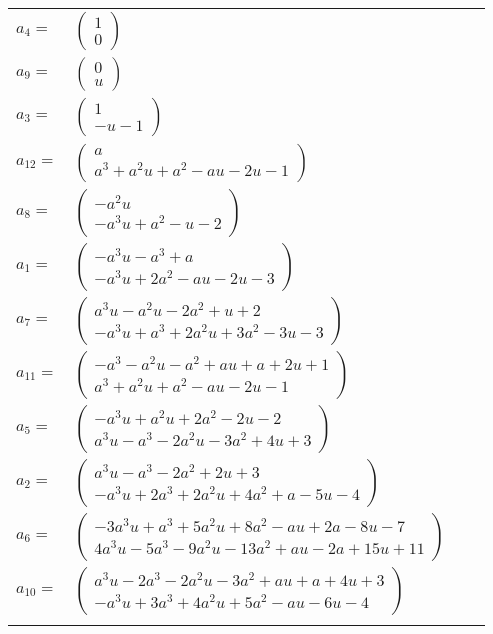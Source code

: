 \documentclass[1p]{elsarticle_modified}
\theoremstyle{definition}
\begin{document}
\begin{tabular}{m{7pt} m{180pt} m{7pt} m{180pt} }
\flushright $a_{4}=$&$\begin{pmatrix}1\\0\end{pmatrix}$ \\
\flushright $a_{9}=$&$\begin{pmatrix}0\\u\end{pmatrix}$ \\
\flushright $a_{3}=$&$\begin{pmatrix}1\\- u-1\end{pmatrix}$ \\
\flushright $a_{12}=$&$\begin{pmatrix}a\\a^3+a^2 u+a^2- a u-2 u-1\end{pmatrix}$ \\
\flushright $a_{8}=$&$\begin{pmatrix}- a^2 u\\- a^3 u+a^2- u-2\end{pmatrix}$ \\
\flushright $a_{1}=$&$\begin{pmatrix}- a^3 u- a^3+a\\- a^3 u+2 a^2- a u-2 u-3\end{pmatrix}$ \\
\flushright $a_{7}=$&$\begin{pmatrix}a^3 u- a^2 u-2 a^2+u+2\\- a^3 u+a^3+2 a^2 u+3 a^2-3 u-3\end{pmatrix}$ \\
\flushright $a_{11}=$&$\begin{pmatrix}- a^3- a^2 u- a^2+a u+a+2 u+1\\a^3+a^2 u+a^2- a u-2 u-1\end{pmatrix}$ \\
\flushright $a_{5}=$&$\begin{pmatrix}- a^3 u+a^2 u+2 a^2-2 u-2\\a^3 u- a^3-2 a^2 u-3 a^2+4 u+3\end{pmatrix}$ \\
\flushright $a_{2}=$&$\begin{pmatrix}a^3 u- a^3-2 a^2+2 u+3\\- a^3 u+2 a^3+2 a^2 u+4 a^2+a-5 u-4\end{pmatrix}$ \\
\flushright $a_{6}=$&$\begin{pmatrix}-3 a^3 u+a^3+5 a^2 u+8 a^2- a u+2 a-8 u-7\\4 a^3 u-5 a^3-9 a^2 u-13 a^2+a u-2 a+15 u+11\end{pmatrix}$ \\
\flushright $a_{10}=$&$\begin{pmatrix}a^3 u-2 a^3-2 a^2 u-3 a^2+a u+a+4 u+3\\- a^3 u+3 a^3+4 a^2 u+5 a^2- a u-6 u-4\end{pmatrix}$\\&\end{tabular}
\end{document}
